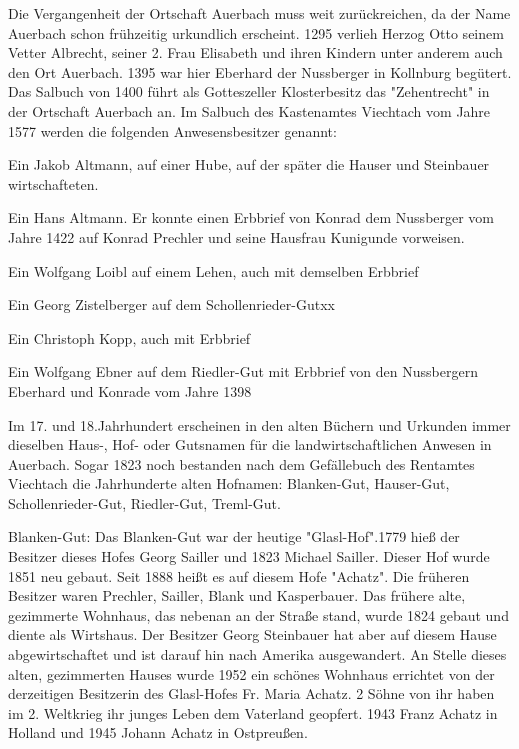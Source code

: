 Die Vergangenheit der Ortschaft Auerbach muss weit zurückreichen, da der Name
Auerbach schon frühzeitig urkundlich erscheint. 1295 verlieh Herzog Otto seinem
Vetter Albrecht, seiner 2. Frau Elisabeth und ihren Kindern unter anderem auch
den Ort Auerbach. 1395 war hier Eberhard der Nussberger in Kollnburg begütert.
Das Salbuch von 1400 führt als Gotteszeller Klosterbesitz das "Zehentrecht" in
der Ortschaft Auerbach an. Im Salbuch des Kastenamtes Viechtach vom Jahre 1577
werden die folgenden Anwesensbesitzer genannt:



Ein Jakob Altmann, auf einer Hube, auf der später die Hauser und Steinbauer
wirtschafteten.

Ein Hans Altmann. Er konnte einen Erbbrief von Konrad dem Nussberger vom Jahre
1422 auf Konrad Prechler und seine Hausfrau Kunigunde vorweisen.

Ein Wolfgang Loibl auf einem Lehen, auch mit demselben Erbbrief

Ein Georg Zistelberger auf dem Schollenrieder-Gutxx

Ein Christoph Kopp, auch mit Erbbrief

Ein Wolfgang Ebner auf dem Riedler-Gut mit Erbbrief von den Nussbergern Eberhard
und Konrade vom Jahre 1398



Im 17. und 18.Jahrhundert erscheinen in den alten Büchern und Urkunden immer
dieselben Haus-, Hof- oder Gutsnamen für die landwirtschaftlichen Anwesen in
Auerbach. Sogar 1823 noch bestanden nach dem Gefällebuch des Rentamtes Viechtach
die Jahrhunderte alten Hofnamen: Blanken-Gut, Hauser-Gut, Schollenrieder-Gut,
Riedler-Gut, Treml-Gut.

Blanken-Gut: Das Blanken-Gut war der heutige "Glasl-Hof".1779 hieß der Besitzer
dieses Hofes Georg Sailler und 1823 Michael Sailler. Dieser Hof wurde 1851 neu
gebaut. Seit 1888 heißt es auf diesem Hofe "Achatz". Die früheren Besitzer waren
Prechler, Sailler, Blank und Kasperbauer. Das frühere alte, gezimmerte Wohnhaus,
das nebenan an der Straße stand, wurde 1824 gebaut und diente als Wirtshaus. Der
Besitzer Georg Steinbauer hat aber auf diesem Hause abgewirtschaftet und ist
darauf hin nach Amerika ausgewandert. An Stelle dieses alten, gezimmerten Hauses
wurde 1952 ein schönes Wohnhaus errichtet von der derzeitigen Besitzerin des
Glasl-Hofes Fr. Maria Achatz. 2 Söhne von ihr haben im 2. Weltkrieg ihr junges
Leben dem Vaterland geopfert. 1943 Franz Achatz in Holland und 1945 Johann
Achatz in Ostpreußen.

